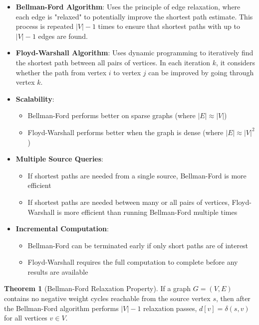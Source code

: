 \documentclass{article}
\theoremstyle{definition}
\newtheorem{theorem}{Theorem}
\begin{document}
\begin{itemize}
\item \textbf{Bellman-Ford Algorithm}: Uses the principle of edge relaxation, where each edge is "relaxed" to potentially improve the shortest path estimate. This process is repeated $|V|-1$ times to ensure that shortest paths with up to $|V|-1$ edges are found.

\item \textbf{Floyd-Warshall Algorithm}: Uses dynamic programming to iteratively find the shortest path between all pairs of vertices. In each iteration $k$, it considers whether the path from vertex $i$ to vertex $j$ can be improved by going through vertex $k$.
\end{itemize}

\begin{itemize}
\item \textbf{Scalability}:
  \begin{itemize}
  \item Bellman-Ford performs better on sparse graphs (where $|E| \approx |V|$)
  \item Floyd-Warshall performs better when the graph is dense (where $|E| \approx |V|^2$)
  \end{itemize}

\item \textbf{Multiple Source Queries}:
  \begin{itemize}
  \item If shortest paths are needed from a single source, Bellman-Ford is more efficient
  \item If shortest paths are needed between many or all pairs of vertices, Floyd-Warshall is more efficient than running Bellman-Ford multiple times
  \end{itemize}

\item \textbf{Incremental Computation}:
  \begin{itemize}
  \item Bellman-Ford can be terminated early if only short paths are of interest
  \item Floyd-Warshall requires the full computation to complete before any results are available
  \end{itemize}
\end{itemize}

\begin{theorem}[Bellman-Ford Relaxation Property]
If a graph $G = (V, E)$ contains no negative weight cycles reachable from the source vertex $s$, then after the Bellman-Ford algorithm performs $|V|-1$ relaxation passes, $d[v] = \delta(s,v)$ for all vertices $v \in V$.
\end{theorem}
\end{document}

